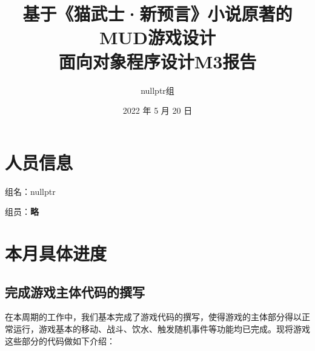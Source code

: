 \documentclass[hyperref,UTF8,a4paper]{ctexart}
\title{基于《猫武士·新预言》小说原著的MUD游戏设计\\
\bigskip \large 面向对象程序设计M3报告}
\author{nullptr组}
\date{2022 年 5 月 20 日}
\begin{document}
\maketitle

\hypertarget{ux4ebaux5458ux4fe1ux606f}{%
\section{人员信息}\label{ux4ebaux5458ux4fe1ux606f}}

组名：nullptr

组员：\textbf{略}

\hypertarget{ux672cux6708ux5177ux4f53ux8fdbux5ea6}{%
\section{本月具体进度}\label{ux672cux6708ux5177ux4f53ux8fdbux5ea6}}

\hypertarget{ux5b8cux6210ux6e38ux620fux4e3bux4f53ux4ee3ux7801ux7684ux64b0ux5199}{%
\subsection{完成游戏主体代码的撰写}\label{ux5b8cux6210ux6e38ux620fux4e3bux4f53ux4ee3ux7801ux7684ux64b0ux5199}}

在本周期的工作中，我们基本完成了游戏代码的撰写，使得游戏的主体部分得以正常运行，游戏基本的移动、战斗、饮水、触发随机事件等功能均已完成。现将游戏这些部分的代码做如下介绍：
\end{document}
